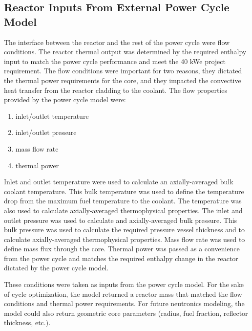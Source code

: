 \subsection{Reactor Inputs From External Power Cycle Model}
The interface between the reactor and the rest of the power cycle were flow
conditions. The reactor thermal output was determined by the required enthalpy
input to match the power cycle performance and meet the 40 kWe project
requirement. The flow conditions were important for two reasons, they dictated
the thermal power requirements for the core, and they impacted the convective
heat transfer from the reactor cladding to the coolant. The flow properties
provided by the power cycle model were:

\begin{enumerate}
    \item inlet/outlet temperature
    \item inlet/outlet pressure
    \item mass flow rate
    \item thermal power
\end{enumerate}

Inlet and outlet temperature were used to calculate an axially-averaged bulk
coolant temperature. This bulk temperature was used to define the temperature
drop from the maximum fuel temperature to the coolant. The temperature was also
used to calculate axially-averaged thermophysical properties. The inlet and
outlet pressure was used to calculate and axially-averaged bulk pressure. This
bulk pressure was used to calculate the required pressure vessel thickness and
to calculate axially-averaged thermophysical properties. Mass flow rate was used
to define mass flux through the core. Thermal power was passed as a convenience
from the power cycle and matches the required enthalpy change in the reactor
dictated by the power cycle model.

These conditions were taken as inputs from the power cycle model. For the sake of
cycle optimization, the model returned a reactor mass that matched the flow
conditions and thermal power requirements. For future neutronics modeling, the
model could also return geometric core parameters (radius, fuel fraction,
reflector thickness, etc.). 

